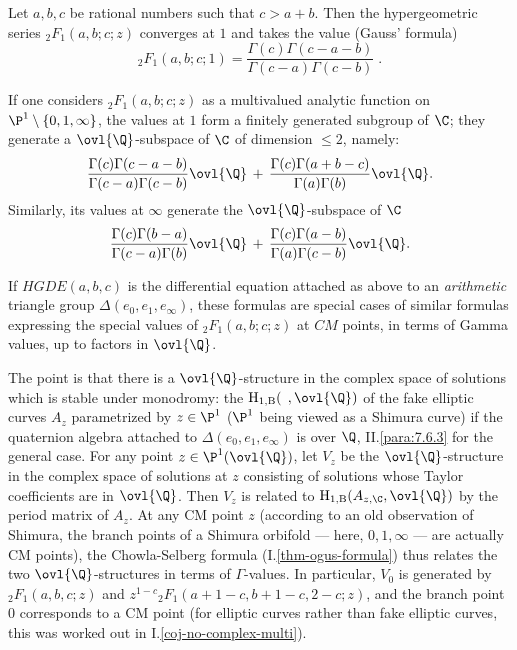 \begin{para}\label{para::5.6.1} Let $a,b,c$ be rational numbers such that
 $c>a+b$. Then the hypergeometric series ${}_2F_1(a,b;c;z)$ 
 converges at $1$ and takes the value (Gauss' formula) 
 \begin{equation*}
  {}_2F_1(a,b;c;1)= \frac{\Gamma(c)\Gamma(c-a-b)}{\Gamma(c-a)\Gamma(c-b)}\;.
 \end{equation*}   

\noindent If one considers ${}_2F_1(a,b;c;z)$ as a multivalued analytic
function on $\P^1\setminus\{0,1,\infty\}$, the 
values at $1$ form a finitely generated subgroup of $\C$; they generate
a $\ovl{\Q}$-subspace of $\C$ of dimension $\leq 2$,
namely:  
\begin{equation*}
 \frac{\Gamma(c)\Gamma(c-a-b)}{\Gamma(c-a)\Gamma(c-b)}\ovl{\Q} \, +\,
  \frac{\Gamma(c)\Gamma(a+b-c)}{\Gamma(a)\Gamma(b)}\ovl{\Q}. 
\end{equation*}
Similarly, its
values at $\infty$ generate the $\ovl{\Q}$-subspace of $\C$  
\begin{equation*}
 \frac{\Gamma(c)\Gamma(b-a)}{\Gamma(c-a)\Gamma(b)}\ovl{\Q} \, +\,
  \frac{\Gamma(c)\Gamma(a-b)}{\Gamma(a)\Gamma(c-b)}\ovl{\Q}. 
\end{equation*}   
\end{para}

\begin{para}\label{para::5.6.2} If $HGDE(a,b,c)$ is the differential equation
 attached as above to an {\it arithmetic} triangle group
$\Delta(e_0,e_1,e_\infty)$, these formulas are special cases of similar
formulas expressing the special values of ${}_2F_1(a,b;c;z)$ at $CM $
points, in terms of Gamma values, up to factors in $\ovl{\Q}$.

The point is that there is a $\ovl{\Q}$-structure in
the complex space of solutions which is stable under monodromy: the
 $\mathrm{H}_{1,\mathrm{B}}({\;\,},\ovl{\Q})$ of the fake elliptic curves $A_z$
 parametrized by $z\in\P^1$ ($\P^1$ being viewed as a Shimura curve) if
the quaternion algebra attached to $\Delta(e_0,e_1,e_\infty)$ is over
$\Q$, \cf II.\ref{para:7.6.3} for the general case. For any point $z\in
\P^1(\ovl{\Q})$, let $V_z$ be the $\ovl{\Q}$-structure in the complex
space of solutions at $z$ consisting of solutions whose Taylor
coefficients are in $\ovl{\Q}$. Then $V_z$ is related to
$\mathrm{H}_{1,\mathrm{B}}(A_{z,\C},\ovl{\Q})$ by the period matrix of
 $A_z$. At any CM 
point $z$ (according to an old observation of Shimura, the branch points
of a Shimura orbifold --- here, $0,1,\infty$ --- are actually CM points),
the Chowla-Selberg formula (I.\ref{thm-ogus-formula}) thus relates the two
$\ovl{\Q}$-structures in terms of $\Gamma$-values. In particular, $V_0$
is generated by ${}_2F_1(a,b,c;z)$ and
$z^{1-c}{}_2F_1(a+1-c,b+1-c,2-c;z)$, and the branch point $0$
corresponds to a CM point (for elliptic curves rather than fake elliptic
curves, this was worked out in I.\ref{coj-no-complex-multi}).
\end{para}

